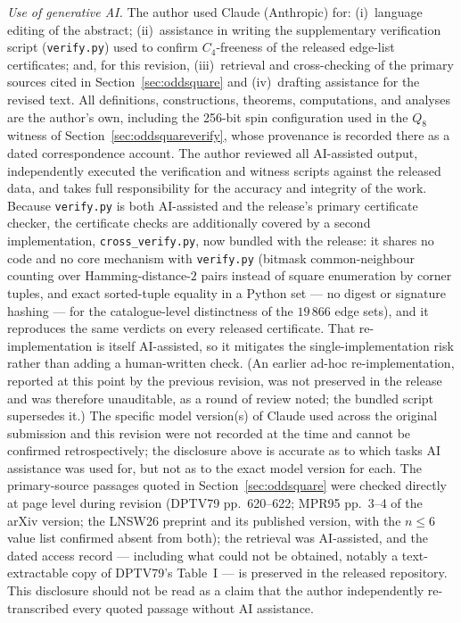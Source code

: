 \documentclass[12pt]{article}
\begin{document}
\noindent\textit{Use of generative AI.} The author used Claude (Anthropic)
for: (i)~language editing of the abstract; (ii)~assistance in writing the
supplementary verification script (\texttt{verify.py}) used to confirm
$C_4$-freeness of the released edge-list certificates; and, for this
revision, (iii)~retrieval and cross-checking of the primary sources cited
in Section~\ref{sec:oddsquare} and (iv)~drafting assistance for the revised
text. All definitions, constructions, theorems, computations, and analyses
are the author's own, including the 256-bit spin configuration used in
the $Q_8$ witness of Section~\ref{sec:oddsquareverify}, whose provenance
is recorded there as a dated correspondence account. The author reviewed all
AI-assisted output, independently executed the verification and witness
scripts against the released data, and takes full responsibility for the
accuracy and integrity of the work. Because \texttt{verify.py} is both
AI-assisted and the release's primary certificate checker, the certificate
checks are additionally covered by a second implementation,
\texttt{cross\_verify.py}, now bundled with the release: it shares no code
and no core mechanism with \texttt{verify.py} (bitmask common-neighbour
counting over Hamming-distance-$2$ pairs instead of square enumeration by
corner tuples, and exact sorted-tuple equality in a Python set --- no
digest or signature hashing --- for the
catalogue-level distinctness of the $19\,866$ edge sets), and it reproduces
the same verdicts on every released certificate. That re-implementation is
itself AI-assisted, so it mitigates the single-implementation risk rather
than adding a human-written check. (An earlier ad-hoc re-implementation,
reported at this point by the previous revision, was not preserved in the
release and was therefore unauditable, as a round of review noted; the
bundled script supersedes it.) The specific model version(s) of
Claude used across the original submission and this revision were not
recorded at the time and cannot be confirmed retrospectively; the
disclosure above is accurate as to which tasks AI assistance was used
for, but not as to the exact model version for each. The primary-source passages quoted in Section~\ref{sec:oddsquare}
were checked directly at page level during revision (DPTV79
pp.~620--622; MPR95 pp.~3--4 of the arXiv version; the LNSW26
preprint and its published version, with the $n\le6$ value list
confirmed absent from both); the retrieval was AI-assisted, and the
dated access record --- including what could not be obtained, notably
a text-extractable copy of DPTV79's Table~I --- is preserved in the
released repository. This disclosure should not be read as a claim
that the author independently re-transcribed every quoted passage
without AI assistance.
\end{document}
